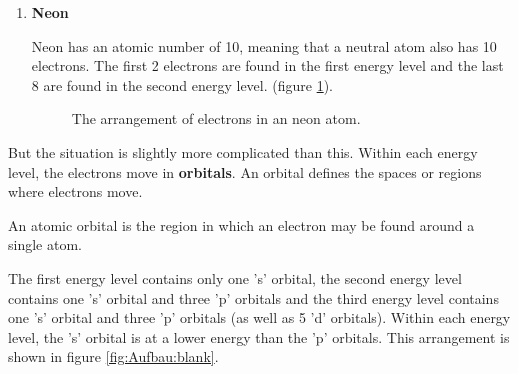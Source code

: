 \begin{enumerate}[noitemsep, label=\textbf{\arabic*}. ]
\item{\textbf{Neon} \\
\begin{minipage}{.4\textwidth}
Neon has an atomic number of 10, meaning that a neutral atom also has 10 electrons. The first 2 electrons are found in the first energy level and the last 8 are found in the second energy level. (figure \ref{fig:atom:argon}).
\end{minipage}
\begin{minipage}{.6\textwidth}
\begin{figure}[H]
\begin{center}
\caption{The arrangement of electrons in an neon atom.}
\label{fig:atom:argon}
\end{center}
\end{figure}
\end{minipage}
}
\end{enumerate}


\label{m38741*id259478}But the situation is slightly more complicated than this. Within each energy level, the electrons move in \textbf{orbitals}. An orbital defines the spaces or regions where electrons move.\par 

 { \label{m38741*meaningfhsst!!!underscore!!!id687}
        \label{m38741*id259495}An atomic orbital is the region in which an electron may be found around a single atom.} 

\label{m38741*id6732}
The first energy level contains only one 's' orbital, the second energy level contains one 's' orbital and three 'p' orbitals and the third energy level contains one 's' orbital and three 'p' orbitals (as well as 5 'd' orbitals). Within each energy level, the 's' orbital is at a lower energy than the 'p' orbitals. This arrangement is shown in figure \ref{fig:Aufbau:blank}. 

